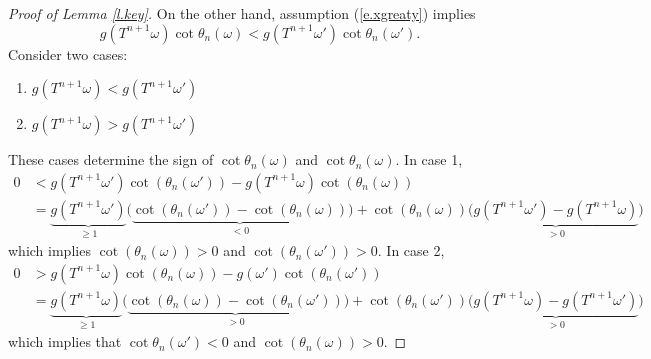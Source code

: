\documentclass{amsart}
\begin{document}
\begin{proof}[Proof of Lemma \ref{l.key}]
    On the other hand, assumption (\ref{e.xgreaty}) implies 
    \begin{equation}\label{e.gxlessgy}
        g(T^{n+1}\omega)\cot\theta_{n}(\omega) < g(T^{n+1}\omega')\cot\theta_{n}(\omega').
    \end{equation}
    Consider two cases:
    \begin{enumerate}
        \item $g(T^{n+1}\omega) < g(T^{n+1}\omega')$
        \item $g(T^{n+1}\omega) > g(T^{n+1}\omega')$
    \end{enumerate}
    These cases determine the sign of $\cot\theta_{n}(\omega)$ and $\cot\theta_{n}(\omega)$. In case 1,
    \begin{align*}
        0 &< g(T^{n+1}\omega')\cot(\theta_{n}(\omega')) - g(T^{n+1}\omega)\cot(\theta_{n}(\omega))\\
        &= \underbrace{g(T^{n+1}\omega')}_{\geq 1}\Big(\underbrace{\cot(\theta_{n}(\omega')) - \cot(\theta_{n}(\omega))}_{<0}\Big) + \cot(\theta_{n}(\omega))\Big(\underbrace{g(T^{n+1}\omega') - g(T^{n+1}\omega)}_{>0}\Big)
    \end{align*}
    which implies $\cot(\theta_{n}(\omega)) > 0$ and $\cot(\theta_n(\omega'))>0$. In case 2,
    \begin{align*}
        0 &> g(T^{n+1}\omega)\cot(\theta_{n}(\omega)) - g(\omega')\cot(\theta_{n}(\omega'))\\
        &= \underbrace{g(T^{n+1}\omega)}_{\geq 1}\Big(\underbrace{\cot(\theta_{n}(\omega)) - \cot(\theta_{n}(\omega'))}_{>0}\Big) + \cot(\theta_{n}(\omega')) \Big(\underbrace{g(T^{n+1}\omega) - g(T^{n+1}\omega')}_{>0}\Big)
    \end{align*}
    which implies that $\cot\theta_{n}(\omega') < 0$ and $\cot(\theta_n(\omega))>0$. 
    

\end{proof}
\end{document}
